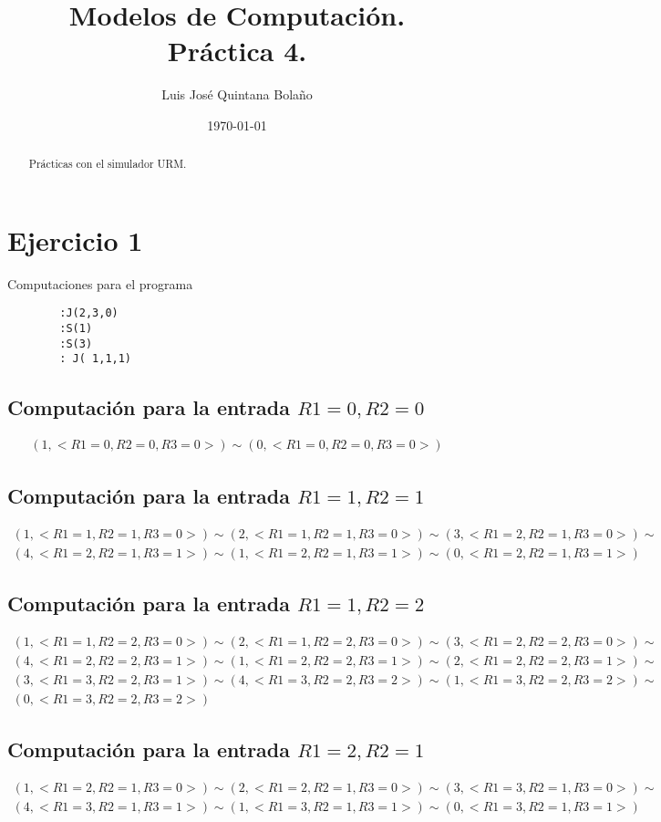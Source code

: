 \documentclass[a4paper]{article}
\title{Modelos de Computación.\\ Práctica 4. }
\author{Luis José Quintana Bolaño}
\date{\today}
\begin{document}
		\maketitle
		\begin{abstract}
		    Prácticas con el simulador URM.
  		\end{abstract}
		\section{Ejercicio 1}
		Computaciones para el programa
		\begin{verbatim}
		:J(2,3,0)
		:S(1)
 		:S(3)
		: J( 1,1,1)
		\end{verbatim}
  		\subsection{Computación para la entrada $R1=0, R2=0$}
		\begin{equation*}\begin{gathered}
		(1, <R1=0, R2=0, R3=0>) \sim (0, <R1=0, R2=0, R3=0>)
		\end{gathered}\end{equation*}
		\subsection{Computación para la entrada $R1=1, R2=1$}
		\begin{equation*}\begin{gathered}
		(1, <R1=1, R2=1, R3=0>) \sim (2, <R1=1, R2=1, R3=0>) \sim (3, <R1=2, R2=1, R3=0>) \sim\\
		(4, <R1=2, R2=1, R3=1>) \sim (1, <R1=2, R2=1, R3=1>) \sim (0, <R1=2, R2=1, R3=1>)
		\end{gathered}\end{equation*}
		\subsection{Computación para la entrada $R1=1, R2=2$}
		\begin{equation*}\begin{gathered}
		(1, <R1=1, R2=2, R3=0>) \sim (2, <R1=1, R2=2, R3=0>) \sim (3, <R1=2, R2=2, R3=0>) \sim\\
		(4, <R1=2, R2=2, R3=1>) \sim (1, <R1=2, R2=2, R3=1>) \sim (2, <R1=2, R2=2, R3=1>) \sim\\
		(3, <R1=3, R2=2, R3=1>) \sim (4, <R1=3, R2=2, R3=2>) \sim (1, <R1=3, R2=2, R3=2>) \sim\\
		(0, <R1=3, R2=2, R3=2>)
		\end{gathered}\end{equation*}
		\subsection{Computación para la entrada $R1=2, R2=1$}
		\begin{equation*}\begin{gathered}
		(1, <R1=2, R2=1, R3=0>) \sim (2, <R1=2, R2=1, R3=0>) \sim (3, <R1=3, R2=1, R3=0>) \sim\\
		(4, <R1=3, R2=1, R3=1>) \sim (1, <R1=3, R2=1, R3=1>) \sim (0, <R1=3, R2=1, R3=1>)
		\end{gathered}\end{equation*}
\end{document}
